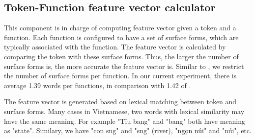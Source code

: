 \subsection{Token-Function feature vector calculator}
\label{sec:model.word-function}
This component is in charge of computing feature vector given a token and a function. Each function is configured to have a set of surface forms, which are typically associated with the function. The feature vector is calculated by comparing the token with these surface forms. Thus, the larger the number of surface forms is, the more accurate the feature vector is. Similar to \cite{Clarke:2010:DSP:1870568.1870571}, we restrict the number of surface forms per function. In our current experiment, there is average 1.39 words per functions, in comparison with 1.42 of \cite{Clarke:2010:DSP:1870568.1870571}.

The feature vector is generated based on lexical matching between token and surface forms. Many cases in Vietnamese, two words with lexical similarity may have the same meaning. For example "{\selectfont Ti\h\ecircumflex u bang" and "bang" both have meaning as "state". Similary, we have "con s\ocircumflex ng" and "s\ocircumflex ng" (river), "ng\d{o}n n\'ui" and "n\'ui", etc.} 